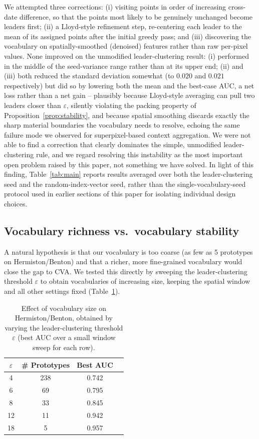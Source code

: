 \documentclass[11pt]{article}
\begin{document}
We attempted three corrections: (i) visiting points in order of increasing cross-date difference, so that the points most likely to be genuinely unchanged become leaders first; (ii) a Lloyd-style refinement step, re-centering each leader to the mean of its assigned points after the initial greedy pass; and (iii) discovering the vocabulary on spatially-smoothed (denoised) features rather than raw per-pixel values. None improved on the unmodified leader-clustering result: (i) performed in the middle of the seed-variance range rather than at its upper end; (ii) and (iii) both reduced the standard deviation somewhat (to $0.020$ and $0.021$ respectively) but did so by lowering both the mean and the best-case AUC, a net loss rather than a net gain -- plausibly because Lloyd-style averaging can pull two leaders closer than $\varepsilon$, silently violating the packing property of Proposition~\ref{prop:stability}, and because spatial smoothing discards exactly the sharp material boundaries the vocabulary needs to resolve, echoing the same failure mode we observed for superpixel-based context aggregation. We were not able to find a correction that clearly dominates the simple, unmodified leader-clustering rule, and we regard resolving this instability as the most important open problem raised by this paper, not something we have solved. In light of this finding, Table~\ref{tab:main} reports results averaged over both the leader-clustering seed and the random-index-vector seed, rather than the single-vocabulary-seed protocol used in earlier sections of this paper for isolating individual design choices.

\subsection{Vocabulary richness vs.\ vocabulary stability}
\label{sec:richness}

A natural hypothesis is that our vocabulary is too coarse (as few as 5 prototypes on Hermiston/Benton) and that a richer, more fine-grained vocabulary would close the gap to CVA. We tested this directly by sweeping the leader-clustering threshold $\varepsilon$ to obtain vocabularies of increasing size, keeping the spatial window and all other settings fixed (Table~\ref{tab:richness}).

\begin{table}[h]
\centering
\caption{Effect of vocabulary size on Hermiston/Benton, obtained by varying the leader-clustering threshold $\varepsilon$ (best AUC over a small window sweep for each row).}
\label{tab:richness}
\begin{tabular}{cccc}
\toprule
$\varepsilon$ & \# Prototypes & Best AUC \\
\midrule
4  & 238 & 0.742 \\
6  & 69  & 0.795 \\
8  & 33  & 0.845 \\
12 & 11  & 0.942 \\
18 & 5   & 0.957 \\
\bottomrule
\end{tabular}
\end{table}
\end{document}

